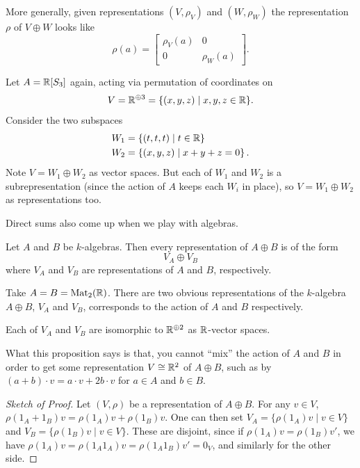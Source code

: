More generally, given representations $(V, \rho_V)$ and $(W, \rho_W)$
the representation $\rho$ of $V \oplus W$ looks like
\[ \rho(a) =
	\begin{bmatrix}
		\rho_V(a) & 0 \\ 0 & \rho_W(a)
	\end{bmatrix}.
\]
\begin{example}
	Let $A = \mathbb R[S_3]$ again,
	acting via permutation of coordinates on
	\[ V = \mathbb R^{\oplus 3} = \{ (x,y,z) \mid x,y,z \in \mathbb R \}. \]
	Consider the two subspaces
	\begin{align*}
		W_1 &= \left\{ (t,t,t) \mid t \in \mathbb R \right\} \\
		W_2 &= \left\{ (x,y,z) \mid x+y+z = 0 \right\}.
	\end{align*}
	Note $V = W_1 \oplus W_2$ as vector spaces.
	But each of $W_1$ and $W_2$ is a subrepresentation
	(since the action of $A$ keeps each $W_i$ in place),
	so $V = W_1 \oplus W_2$ as representations too.
\end{example}

Direct sums also come up when we play with algebras.
\begin{proposition}
	\label{prop:rep_direct_sum}
	Let $A$ and $B$ be $k$-algebras.
	Then every representation of $A \oplus B$ is of the form
	\[ V_A \oplus V_B \]
	where $V_A$ and $V_B$ are representations of $A$ and $B$, respectively.
\end{proposition}

\begin{example}
	Take $A=B=\mathrm{Mat}_2(\mathbb R)$. There are two obvious representations
	of the $k$-algebra $A \oplus B$,
	$V_A$ and $V_B$, corresponds to the action of $A$ and $B$ respectively.

	Each of $V_A$ and $V_B$ are isomorphic
	to $\mathbb R^{\oplus 2}$ as $\mathbb R$-vector spaces.

	What this proposition says is that, you cannot ``mix'' the action of
	$A$ and $B$ in order to get some representation $V\cong\mathbb R^2$ of
	$A \oplus B$, such as by $(a+b)\cdot v = a\cdot v+2 b\cdot v$
	for $a\in A$ and $b\in B$.
\end{example}

\begin{proof}[Sketch of Proof]
	Let $(V, \rho)$ be a representation of $A \oplus B$.
	For any $v \in V$, $\rho(1_A+1_B)v = \rho(1_A)v + \rho(1_B)v$.
	One can then set $V_A = \{ \rho(1_A)v \mid v \in V \}$
	and $V_B = \{ \rho(1_B)v \mid v \in V \}$.
	These are disjoint, since if $\rho(1_A) v = \rho(1_B) v'$,
	we have $\rho(1_A)v = \rho(1_A1_A)v = \rho(1_A1_B) v' = 0_V$,
	and similarly for the other side.
\end{proof}

